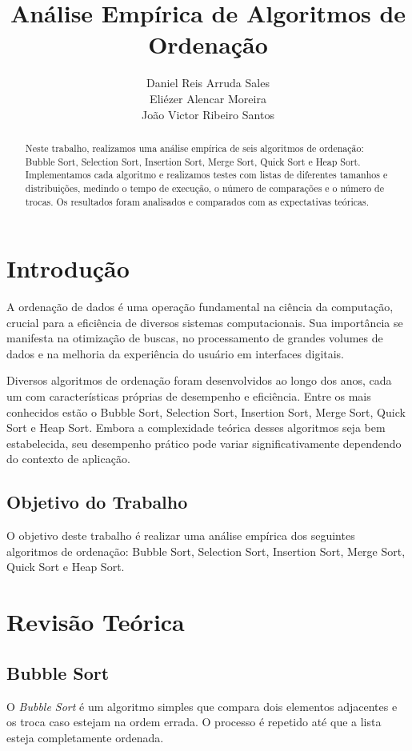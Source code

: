 \documentclass[12pt,a4paper]{article}
\title{Análise Empírica de Algoritmos de Ordenação}
\author{Daniel Reis Arruda Sales \\ Eliézer Alencar Moreira \\ João Victor Ribeiro Santos}
\date{}
\begin{document}
\maketitle

\begin{abstract}
Neste trabalho, realizamos uma análise empírica de seis algoritmos de ordenação: Bubble Sort, Selection Sort, Insertion Sort, Merge Sort, Quick Sort e Heap Sort. Implementamos cada algoritmo e realizamos testes com listas de diferentes tamanhos e distribuições, medindo o tempo de execução, o número de comparações e o número de trocas. Os resultados foram analisados e comparados com as expectativas teóricas.
\end{abstract}

\tableofcontents

\section{Introdução}
A ordenação de dados é uma operação fundamental na ciência da computação, crucial para a eficiência de diversos sistemas computacionais. Sua importância se manifesta na otimização de buscas, no processamento de grandes volumes de dados e na melhoria da experiência do usuário em interfaces digitais.

Diversos algoritmos de ordenação foram desenvolvidos ao longo dos anos, cada um com características próprias de desempenho e eficiência. Entre os mais conhecidos estão o Bubble Sort, Selection Sort, Insertion Sort, Merge Sort, Quick Sort e Heap Sort. Embora a complexidade teórica desses algoritmos seja bem estabelecida, seu desempenho prático pode variar significativamente dependendo do contexto de aplicação.

\subsection{Objetivo do Trabalho}
O objetivo deste trabalho é realizar uma análise empírica dos seguintes algoritmos de ordenação: Bubble Sort, Selection Sort, Insertion Sort, Merge Sort, Quick Sort e Heap Sort.

\section{Revisão Teórica}
\subsection{Bubble Sort}
O \textit{Bubble Sort} é um algoritmo simples que compara dois elementos adjacentes e os troca caso estejam na ordem errada. O processo é repetido até que a lista esteja completamente ordenada.
\end{document}
